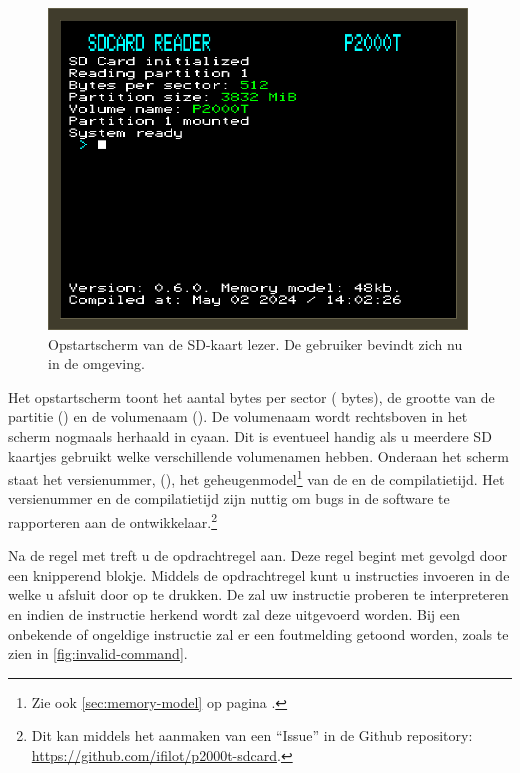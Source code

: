 \begin{figure}[h!]
    \centering
    \includegraphics[width=0.99\textwidth]{img/boot.png}
    \caption{Opstartscherm van de SD-kaart lezer. De gebruiker bevindt zich nu in de \launcher omgeving.}
    \label{fig:screenshot-boot}
\end{figure}


Het opstartscherm toont het aantal bytes per sector ( bytes), de grootte van de partitie () en de volumenaam (). De volumenaam wordt rechtsboven in het scherm nogmaals herhaald in cyaan. Dit is eventueel handig als u meerdere SD kaartjes gebruikt welke verschillende volumenamen hebben. Onderaan het scherm staat het versienummer, (), het geheugenmodel\footnote{Zie ook \cref{sec:memory-model} op pagina \pageref{sec:memory-model}.} van de  en de compilatietijd. Het versienummer en de compilatietijd zijn nuttig om bugs in de software te rapporteren aan de ontwikkelaar.\footnote{Dit kan middels het aanmaken van een ``Issue'' in de Github repository: \url{https://github.com/ifilot/p2000t-sdcard}.}

Na de regel met  treft u de opdrachtregel aan. Deze regel begint met \pkc{>} gevolgd door een knipperend blokje. Middels de opdrachtregel kunt u instructies invoeren in de  welke u afsluit door op  te drukken. De \product zal uw instructie proberen te interpreteren en indien de instructie herkend wordt zal deze uitgevoerd worden. Bij een onbekende of ongeldige instructie zal er een foutmelding getoond worden, zoals te zien in \cref{fig:invalid-command}.

